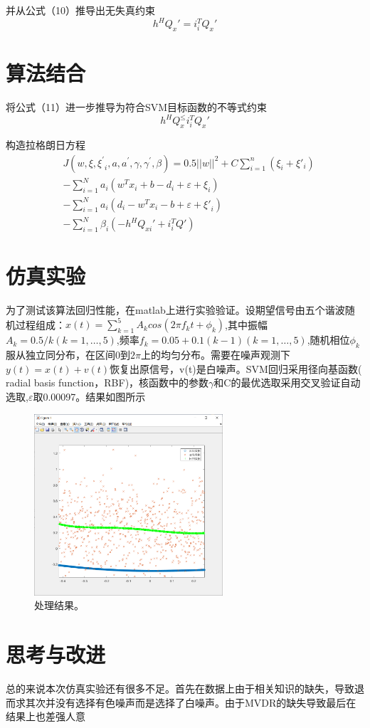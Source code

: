 并从公式（10）推导出无失真约束
\begin{equation}
h^HQ_x'=i_i^TQ_x'
\end{equation}

\section{算法结合}
将公式（11）进一步推导为符合SVM目标函数的不等式约束
\begin{equation}
h^HQ_x^\le i_i^TQ_x'
\end{equation}

构造拉格朗日方程
\begin{equation}
\begin{aligned}
&J\left(w,\xi,{\xi^\prime}_i,a,a^\prime,\gamma,\gamma^\prime,\beta\right)=0.5||w||^2+C\sum\limits_{i=1}^{n}(\xi_i +\xi'_i)\\
&-\sum_{i=1}^{N}{a_i\left(w^Tx_i+b-d_i+\varepsilon+\xi_i\right)}\\
&-\sum_{i=1}^{N}{a_i\left(d_i-w^Tx_i-b+\varepsilon+{\xi'}_i\right)}\\
&-\sum_{i=1}^{N}{\beta_i\left(-h^HQ_{xi}'+i_i^TQ'\right)}
\end{aligned}
\end{equation}

\section{仿真实验}
为了测试该算法回归性能，在matlab上进行实验验证。设期望信号由五个谐波随机过程组成：$x\left(t\right)=\sum_{k=1}^{5}{A_kcos\left(2\pi f_kt+\phi_k\right)}$,其中振幅$A_k=0.5/k\left(k=1,\ldots,5\right)$,频率$f_k=0.05+0.1\left(k-1\right)\left(k=1,\ldots,5\right)$,随机相位$\phi_k$服从独立同分布，在区间0到$2\pi$上的均匀分布。需要在噪声观测下
$y\left(t\right)=x\left(t\right)+v\left(t\right)$恢复出原信号，v(t)是白噪声。SVM回归采用径向基函数( radial basis function，RBF)，核函数中的参数$\gamma$和C的最优选取采用交叉验证自动选取,$\varepsilon$取0.00097。结果如图所示
\begin{figure}[!htbp]
    \centering
    \includegraphics[width=7cm]{pic/res.png}%
    \caption{处理结果。}
    \label{fig:res}
\end{figure}


\section{思考与改进}
总的来说本次仿真实验还有很多不足。首先在数据上由于相关知识的缺失，导致退而求其次并没有选择有色噪声而是选择了白噪声。由于MVDR的缺失导致最后在结果上也差强人意
